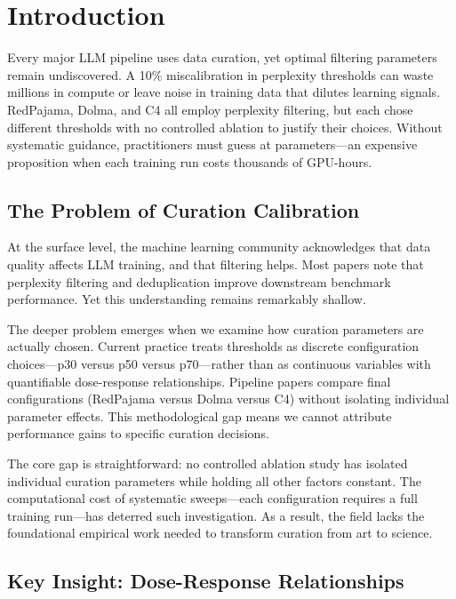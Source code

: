 \section{Introduction}

Every major LLM pipeline uses data curation, yet optimal filtering parameters remain undiscovered. A 10\% miscalibration in perplexity thresholds can waste millions in compute or leave noise in training data that dilutes learning signals. RedPajama, Dolma, and C4 all employ perplexity filtering, but each chose different thresholds with no controlled ablation to justify their choices. Without systematic guidance, practitioners must guess at parameters---an expensive proposition when each training run costs thousands of GPU-hours.

\subsection{The Problem of Curation Calibration}

At the surface level, the machine learning community acknowledges that data quality affects LLM training, and that filtering helps. Most papers note that perplexity filtering and deduplication improve downstream benchmark performance. Yet this understanding remains remarkably shallow.

The deeper problem emerges when we examine how curation parameters are actually chosen. Current practice treats thresholds as discrete configuration choices---p30 versus p50 versus p70---rather than as continuous variables with quantifiable dose-response relationships. Pipeline papers compare final configurations (RedPajama versus Dolma versus C4) without isolating individual parameter effects. This methodological gap means we cannot attribute performance gains to specific curation decisions.

The core gap is straightforward: no controlled ablation study has isolated individual curation parameters while holding all other factors constant. The computational cost of systematic sweeps---each configuration requires a full training run---has deterred such investigation. As a result, the field lacks the foundational empirical work needed to transform curation from art to science.

\subsection{Key Insight: Dose-Response Relationships}

